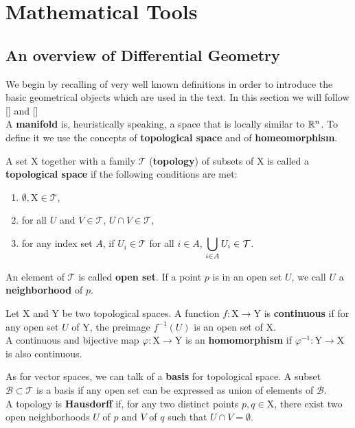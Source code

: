 \chapter{Mathematical Tools}
\label{chapter1}

\section{An overview of Differential Geometry}
We begin by recalling of very well known definitions in order to introduce the basic geometrical objects which are used in the text. In this section we will follow [\citealp{jost}] and [\citealp[Ch. A.3]{bar1}]\\
\noindent A \textbf{manifold} is, heuristically speaking, a space that is locally similar to ${\mathbb R}^n$. To define it we use the concepts of \textbf{topological space} and of \textbf{homeomorphism}.
\begin{definition}
	A set $\mathrm{X}$ together with a family $\mathcal{T}$ (\textbf{topology}) of subsets of $\mathrm{X}$ is called a \textbf{topological space} if the following conditions are met:
	\begin{enumerate}[label=\alph*. ]
		\item $\emptyset,\mathrm{X}\in\mathcal{T}$,
		\item for all $U$ and $V\in\mathcal{T}$, $U\cap V\in\mathcal{T}$,
		\item for any index set $A$, if $U_i\in\mathcal{T}$ for all $i\in A$, $\displaystyle \bigcup_{i\in A} U_i\in\mathcal{T}$.
	\end{enumerate}
	An element of $\mathcal{T}$ is called \textbf{open set}. If a point $p$ is in an open set $U$, we call $U$ a \textbf{neighborhood} of $p$.
\end{definition}

\begin{definition}
	Let $\mathrm{X}$ and $\mathrm{Y}$ be two topological spaces. A function $f:\mathrm{X}\to\mathrm{Y}$ is \textbf{continuous} if for any open set $U$ of $\mathrm{Y}$, the preimage $f^{-1}(U)$ is an open set of $\mathrm{X}$.\\
	A continuous and bijective map $\varphi:\mathrm{X}\to\mathrm{Y}$ is an \textbf{homomorphism} if $\varphi^{-1}:\mathrm{Y}\to\mathrm{X}$ is also continuous.
\end{definition}
\noindent As for vector spaces, we can talk of a \textbf{basis} for topological space. A subset $\mathcal{B}\subset\mathcal{T}$ is a basis if any open set can be expressed as union of elements of $\mathcal{B}$.\\
A topology is \textbf{Hausdorff} if, for any two distinct points $p,q\in\mathrm{X}$, there exist two open neighborhoods $U$ of $p$ and $V$ of $q$ such that $U\cap V=\emptyset$.\\


